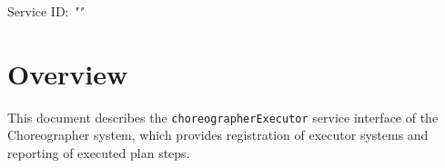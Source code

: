 \documentclass[a4paper]{arrowhead}
\begin{document}
\sloppy

\ArrowheadSetup

\begin{center}
  \vspace*{1cm}
  \huge{\arrowtitle}

  \vspace*{0.2cm}
  \LARGE{\arrowtype}
  \vspace*{1cm}

  \Large{Service ID: \textit{"\arrowid"}}

  \vspace*{\fill}


  \vspace*{1cm}
  \vspace*{\fill}

  \begin{abstract}
    This document describes the HTTP/1.1 protocol with TLS payload security and JSON payload encoding variant of the \texttt{choreographer\allowbreak{}Executor} service of the Choreographer system.
  \end{abstract}

  \vspace*{1cm}
\end{center}

\newpage

\tableofcontents
\newpage

\section{Overview}
\label{sec:overview}

This document describes the \texttt{choreographer\allowbreak{}Executor} service interface of the Choreographer system, which provides registration of executor systems and reporting of executed plan steps.
\end{document}
